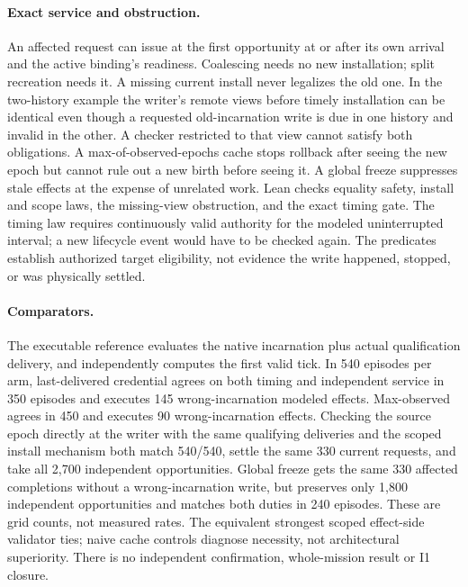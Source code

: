 \documentclass{article}
\begin{document}
\paragraph{Exact service and obstruction.}
An affected request can issue at the first opportunity at or after its own arrival and the active binding's readiness. Coalescing needs no new installation; split recreation needs it. A missing current install never legalizes the old one. In the two-history example the writer's remote views before timely installation can be identical even though a requested old-incarnation write is due in one history and invalid in the other. A checker restricted to that view cannot satisfy both obligations. A max-of-observed-epochs cache stops rollback after seeing the new epoch but cannot rule out a new birth before seeing it. A global freeze suppresses stale effects at the expense of unrelated work. Lean checks equality safety, install and scope laws, the missing-view obstruction, and the exact timing gate. The timing law requires continuously valid authority for the modeled uninterrupted interval; a new lifecycle event would have to be checked again. The predicates establish authorized target eligibility, not evidence the write happened, stopped, or was physically settled.

\paragraph{Comparators.}
The executable reference evaluates the native incarnation plus actual qualification delivery, and independently computes the first valid tick. In 540 episodes per arm, last-delivered credential agrees on both timing and independent service in 350 episodes and executes 145 wrong-incarnation modeled effects. Max-observed agrees in 450 and executes 90 wrong-incarnation effects. Checking the source epoch directly at the writer with the same qualifying deliveries and the scoped install mechanism both match 540/540, settle the same 330 current requests, and take all 2,700 independent opportunities. Global freeze gets the same 330 affected completions without a wrong-incarnation write, but preserves only 1,800 independent opportunities and matches both duties in 240 episodes. These are grid counts, not measured rates. The equivalent strongest scoped effect-side validator ties; naive cache controls diagnose necessity, not architectural superiority. There is no independent confirmation, whole-mission result or I1 closure.
\end{document}
